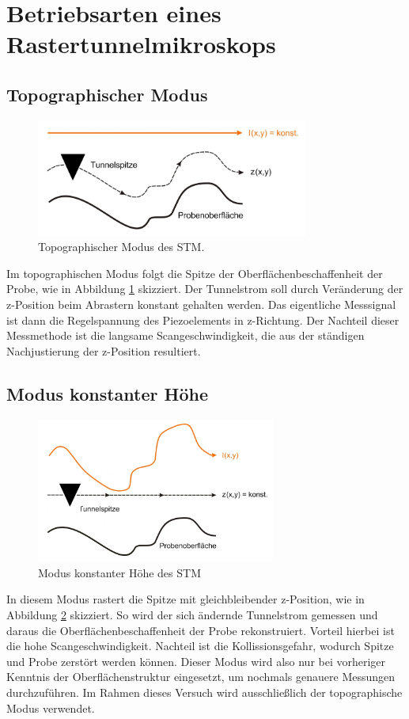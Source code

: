 \section{Betriebsarten eines Rastertunnelmikroskops}
    \subsection{Topographischer Modus}

\begin{figure}[H]
    \centering
    \includegraphics[width=0.8\textwidth]{Abb/topo.png}
    \caption{Topographischer Modus des STM. \cite{beschr}}
    \label{topo}
\end{figure}
Im topographischen Modus folgt die Spitze der Oberflächenbeschaffenheit der Probe,
wie in Abbildung \ref{topo} skizziert. Der Tunnelstrom soll durch Veränderung der 
z-Position beim Abrastern konstant gehalten werden. Das eigentliche Messsignal 
ist dann die Regelspannung des Piezoelements in z-Richtung. Der Nachteil dieser 
Messmethode ist die langsame Scangeschwindigkeit, die aus der ständigen 
Nachjustierung der z-Position resultiert.

    \subsection{Modus konstanter Höhe}

\begin{figure}[h]
    \centering
    \includegraphics[width=0.7\textwidth]{Abb/konst.png}
    \caption{Modus konstanter Höhe des STM \cite{beschr}}
    \label{konst}
\end{figure}
In diesem Modus rastert die Spitze mit gleichbleibender z-Position, wie in Abbildung
\ref{konst} skizziert. So wird der
sich ändernde Tunnelstrom gemessen und daraus die Oberflächenbeschaffenheit der 
Probe rekonstruiert. Vorteil hierbei ist die hohe Scangeschwindigkeit. Nachteil
ist die Kollissionsgefahr, wodurch Spitze und Probe zerstört werden können. Dieser
Modus wird also nur bei vorheriger Kenntnis der Oberflächenstruktur eingesetzt, um 
nochmals genauere Messungen durchzuführen. Im Rahmen dieses Versuch wird 
ausschließlich der topographische Modus verwendet.

